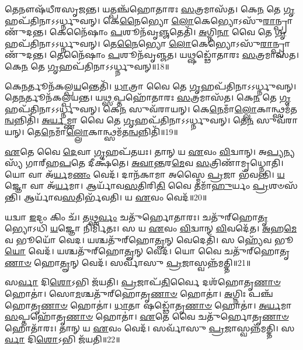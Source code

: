 𑌤𑍇𑌨𑍗𑌷᳴𑌧𑍀𑌰𑌸𑍃𑌜𑌨𑍍𑌤।
𑌯𑌤𑍍𑌪𑌞𑍍𑌚᳴𑌹𑍋𑌤𑌾𑌰𑌃 \ul{𑌸}\-𑌤𑍍𑌰𑌮𑌾𑌸᳴𑌤।
𑌕𑍇\-\ul{𑌨} 𑌤𑍇 \ul{𑌗𑍃}\-𑌹𑌪᳴𑌤𑌿𑌨𑌾\-𑌽𑌽𑌰𑍍𑌧𑍍𑌨𑍁𑌵𑌨𑍍।
𑌕𑍇\-\ul{𑌨𑍈}\-𑌭𑍍𑌯𑍋 \ul{𑌲𑍋}\-𑌕𑍇𑌭𑍍𑌯𑍋\-𑌽𑌸𑍁᳴\-\ul{𑌰𑌾}\-𑌨𑍍𑌪𑍍𑌰𑌾𑌣𑍁᳴𑌦𑌨𑍍𑌤।
𑌕𑍇𑌨𑍈᳴𑌷𑌾𑌂 \ul{𑌪}\-𑌶𑍂𑌨᳴𑌵𑍃\-\ul{𑌞𑍍𑌜}\-𑌤𑍇𑌤𑌿᳴।
\-\ul{𑌅}\-𑌗𑍍𑌨𑌿\-\ul{𑌨𑌾} 𑌵𑍈 𑌤𑍇 \ul{𑌗𑍃}\-𑌹𑌪᳴𑌤𑌿𑌨𑌾\-𑌽𑌽𑌰𑍍𑌧𑍍𑌨𑍁𑌵𑌨𑍍।
𑌤𑍇\-\ul{𑌨𑍈}\-𑌭𑍍𑌯𑍋 \ul{𑌲𑍋}\-𑌕𑍇𑌭𑍍𑌯𑍋\-𑌽𑌸𑍁᳴\-\ul{𑌰𑌾}\-𑌨𑍍𑌪𑍍𑌰𑌾𑌣𑍁᳴𑌦𑌨𑍍𑌤।
𑌤𑍇𑌨𑍈᳴𑌷𑌾𑌂 \ul{𑌪}\-𑌶𑍂𑌨᳴𑌵𑍃𑌞𑍍𑌜𑌤।
𑌯𑌥𑍍𑌷𑌡𑍍𑌢𑍋᳴𑌤𑌾𑌰𑌃 \ul{𑌸}\-𑌤𑍍𑌰𑌮𑌾𑌸᳴𑌤।
𑌕𑍇\-\ul{𑌨} 𑌤𑍇 \ul{𑌗𑍃}\-𑌹𑌪᳴𑌤𑌿𑌨𑌾\-𑌽𑌽𑌰𑍍𑌧𑍍𑌨𑍁𑌵𑌨𑍍॥18॥

𑌕𑍇\-\ul{𑌨}\-𑌰𑍍𑌤𑍂𑌨᳴𑌕𑌲𑍍𑌪\-\ul{𑌯}\-𑌨𑍍𑌤𑍇𑌤𑌿᳴।
\-\ul{𑌧𑌾}\-𑌤𑍍𑌰𑌾 𑌵𑍈 𑌤𑍇 \ul{𑌗𑍃}\-𑌹𑌪᳴𑌤𑌿𑌨𑌾\-𑌽𑌽𑌰𑍍𑌧𑍍𑌨𑍁𑌵𑌨𑍍।
𑌤𑍇\-\ul{𑌨}\-𑌰𑍍𑌤𑍂𑌨᳴𑌕𑌲𑍍𑌪𑌯𑌨𑍍𑌤।
𑌯\-\ul{𑌥𑍍𑌸}\-𑌪𑍍𑌤𑌹𑍋᳴𑌤𑌾𑌰𑌃 \ul{𑌸}\-𑌤𑍍𑌰𑌮𑌾𑌸᳴𑌤।
𑌕𑍇\-\ul{𑌨} 𑌤𑍇 \ul{𑌗𑍃}\-𑌹𑌪᳴𑌤𑌿𑌨𑌾\-𑌽𑌽𑌰𑍍𑌧𑍍𑌨𑍁𑌵𑌨𑍍।
𑌕𑍇\-\ul{𑌨} 𑌸𑍁𑌵᳴𑌰𑌾𑌯𑌨𑍍।
𑌕𑍇\-\ul{𑌨𑍇}\-𑌮𑌾𑌁\-\ul{𑌲𑍍𑌲𑍋}\-𑌕𑌾𑌨𑍍𑌥𑍍𑌸𑌮᳴\-𑌤\-\ul{𑌨𑍍𑌵}\-𑌨𑍍𑌨𑌿𑌤𑌿᳴।
\-\ul{𑌅}\-\-\ul{𑌰𑍍𑌯}\-𑌮𑍍𑌣𑌾 𑌵𑍈 𑌤𑍇 \ul{𑌗𑍃}\-𑌹𑌪᳴𑌤𑌿𑌨𑌾\-𑌽𑌽𑌰𑍍𑌧𑍍𑌨𑍁𑌵𑌨𑍍।
𑌤𑍇\-\ul{𑌨} 𑌸𑍁𑌵᳴𑌰𑌾𑌯𑌨𑍍।
𑌤𑍇\-\ul{𑌨𑍇}\-𑌮𑌾𑌁\-\ul{𑌲𑍍𑌲𑍋}\-𑌕𑌾𑌨𑍍𑌥𑍍𑌸𑌮᳴𑌤\-\ul{𑌨𑍍𑌵}\-𑌨𑍍𑌨𑌿𑌤𑌿᳴॥19॥

\-\ul{𑌏}\-𑌤𑍇 𑌵𑍈 \ul{𑌦𑍇}\-𑌵𑌾 \ul{𑌗𑍃}\-𑌹𑌪᳴𑌤𑌯𑌃।
𑌤𑌾𑌨𑍍 𑌯 \ul{𑌏}\-𑌵𑌂 \ul{𑌵𑌿}\-𑌦𑍍𑌵𑌾𑌨𑍍।
𑌅\-\ul{𑌪𑍍𑌯}\-𑌨𑍍𑌯𑌸𑍍𑌯᳴ 𑌗𑌾𑌰𑍍‌\mbox{}𑌹\-\ul{𑌪}\-𑌤𑍇 𑌦𑍀𑌕𑍍𑌷᳴𑌤𑍇।
\-\ul{𑌅}\-\-\ul{𑌵𑌾}\-\-\ul{𑌨𑍍𑌤}\-𑌰\-\ul{𑌮𑍇}\-𑌵 \ul{𑌸}\-𑌤𑍍𑌰𑌿𑌣𑌾᳴𑌮𑍃𑌧𑍍𑌨𑍋𑌤𑌿।
𑌯𑍋 𑌵𑌾 𑌅᳴\-\ul{𑌰𑍍𑌯}\-𑌮\-\ul{𑌣𑌂} 𑌵𑍇𑌦᳴।
𑌦𑌾𑌨᳴𑌕𑌾𑌮𑌾 𑌅𑌸𑍍𑌮𑍈 \ul{𑌪𑍍𑌰}\-𑌜𑌾 𑌭᳴𑌵𑌨𑍍𑌤𑌿।
\-\ul{𑌯}\-𑌜𑍍𑌞𑍋 𑌵𑌾 𑌅᳴\-\ul{𑌰𑍍𑌯}\-𑌮𑌾।
𑌆𑌰𑍍𑌯𑌾᳴𑌵\-\ul{𑌸}\-𑌤𑌿𑌰𑌿\-\ul{𑌤𑌿} 𑌵𑍈 𑌤𑌮𑌾᳴\-\ul{𑌹𑍁}\-𑌰𑍍𑌯𑌂 \ul{𑌪𑍍𑌰}\-𑌶𑍞𑌸᳴𑌨𑍍𑌤𑌿।
𑌆𑌰𑍍𑌯𑌾᳴𑌵\-\ul{𑌸}\-𑌤𑌿𑌰𑍍𑌭᳴𑌵𑌤𑌿।
𑌯 \ul{𑌏}\-𑌵𑌂 𑌵𑍇𑌦᳴॥20॥

𑌯𑌦𑍍𑌵𑌾 \ul{𑌇}\-𑌦𑌂 𑌕𑌿𑌂 𑌚᳴।
𑌤𑌥𑍍𑌸\-\ul{𑌰𑍍𑌵𑌂} 𑌚𑌤𑍁᳴𑌰𑍍\mbox{}𑌹𑍋𑌤𑌾𑌰𑌃।
𑌚𑌤𑍁᳴𑌰𑍍‌\mbox{}𑌹𑍋\-\ul{𑌤𑍃}\-𑌭𑍍𑌯𑍋𑌽𑌧𑌿᳴ \ul{𑌯}\-𑌜𑍍𑌞𑍋 𑌨𑌿𑌰𑍍𑌮𑌿᳴𑌤𑌃।
𑌸 𑌯 \ul{𑌏}\-𑌵𑌂 \ul{𑌵𑌿}\-𑌦𑍍𑌵𑌾𑌨𑍍‌ \ul{𑌵𑌿}\-𑌵𑌦𑍇᳴𑌤।
\-\ul{𑌅}\-𑌹\-\ul{𑌮𑍇}\-𑌵 𑌭𑍂𑌯𑍋᳴ 𑌵𑍇𑌦।
𑌯𑌶𑍍𑌚𑌤𑍁᳴𑌰𑍍‌\mbox{}𑌹𑍋\-\ul{𑌤𑍄}\-𑌨𑍍 𑌵𑍇𑌦𑍇𑌤𑌿᳴।
𑌸 𑌹𑍍𑌯𑍇᳴𑌵 𑌭𑍂\-\ul{𑌯𑍋} 𑌵𑍇𑌦᳴।
𑌯𑌶𑍍𑌚𑌤𑍁᳴𑌰𑍍‌\mbox{}𑌹𑍋\-\ul{𑌤𑍄}\-𑌨𑍍 𑌵𑍇𑌦᳴।
𑌯𑍋 𑌵𑍈 𑌚𑌤𑍁᳴𑌰𑍍‌\mbox{}𑌹𑍋𑌤𑍃\-\ul{𑌣𑌾}\-\-\ul{𑍞} 𑌹𑍋\-\ul{𑌤𑍄}\-𑌨𑍍 𑌵𑍇𑌦᳴।
𑌸𑌰𑍍𑌵𑌾᳴𑌸𑍁 \ul{𑌪𑍍𑌰}\-𑌜𑌾𑌸𑍍𑌵𑌨𑍍𑌨᳴𑌮𑌤𑍍𑌤𑌿॥21॥

𑌸\-\ul{𑌰𑍍𑌵𑌾} 𑌦𑌿\-\ul{𑌶𑍋}\-𑌽𑌭𑌿 𑌜᳴𑌯𑌤𑌿।
\-\ul{𑌪𑍍𑌰}\-𑌜𑌾𑌪᳴\-\ul{𑌤𑌿}\-𑌰𑍍𑌵𑍈 𑌦𑌶᳴𑌹𑍋𑌤𑍃\-\ul{𑌣𑌾}\-\-\ul{𑍞} 𑌹𑍋𑌤𑌾॑।
𑌸𑍋\-\ul{𑌮}\-𑌶𑍍𑌚𑌤𑍁᳴𑌰𑍍‌\mbox{}𑌹𑍋𑌤𑍃\-\ul{𑌣𑌾}\-\-\ul{𑍞} 𑌹𑍋𑌤𑌾॑।
\-\ul{𑌅}\-𑌗𑍍𑌨𑌿𑌃 𑌪𑌞𑍍𑌚᳴𑌹𑍋𑌤𑍃\-\ul{𑌣𑌾}\-\-\ul{𑍞} 𑌹𑍋𑌤𑌾॑।
\-\ul{𑌧𑌾}\-𑌤𑌾 𑌷𑌡𑍍𑌢𑍋᳴𑌤𑍃\-\ul{𑌣𑌾}\-\-\ul{𑍞} 𑌹𑍋𑌤𑌾॑।
\-\ul{𑌅}\-\-\ul{𑌰𑍍𑌯}\-𑌮𑌾 \ul{𑌸}\-𑌪𑍍𑌤𑌹𑍋᳴𑌤𑍃\-\ul{𑌣𑌾}\-\-\ul{𑍞} 𑌹𑍋𑌤𑌾॑।
\-\ul{𑌏}\-𑌤𑍇 𑌵𑍈 𑌚𑌤𑍁᳴𑌰𑍍\mbox{}𑌹𑍋𑌤𑍃\-\ul{𑌣𑌾}\-\-\ul{𑍞} 𑌹𑍋𑌤𑌾᳴𑌰𑌃।
𑌤𑌾𑌨𑍍 𑌯 \ul{𑌏}\-𑌵𑌂 𑌵𑍇𑌦᳴।
𑌸𑌰𑍍𑌵𑌾᳴𑌸𑍁 \ul{𑌪𑍍𑌰}\-𑌜𑌾𑌸𑍍𑌵𑌨𑍍𑌨᳴𑌮𑌤𑍍𑌤𑌿।
𑌸\-\ul{𑌰𑍍𑌵𑌾} 𑌦𑌿\-\ul{𑌶𑍋}\-𑌽𑌭𑌿 𑌜᳴𑌯𑌤𑌿॥22॥\anuvakamend[\-\ul{𑌆}\-\-\ul{𑌰𑍍𑌧𑍍𑌨𑍁}\-\-\ul{𑌵}\-\-\ul{𑌨𑍍𑌨𑌾}\-\-\ul{𑌰𑍍𑌧𑍍𑌨𑍁}\-\-\ul{𑌵}\-𑌨𑍍𑌨𑌿\-\ul{𑌤𑍍𑌯𑍇}\-𑌵𑌂 𑌵𑍇𑌦𑌾॑𑌤𑍍𑌤𑌿 𑌸\-\ul{𑌰𑍍𑌵𑌾} 𑌦𑌿\-\ul{𑌶𑍋}\-𑌽𑌭𑌿 𑌜᳴𑌯𑌤𑌿 (𑌵𑍈 𑌤𑍇𑌨᳴ \ul{𑌸}\-𑌤𑍍𑌰𑌙𑍍𑌕𑍇𑌨᳴॥)]

